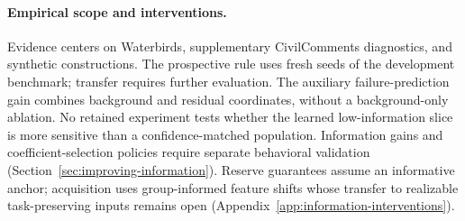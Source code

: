 \paragraph{Empirical scope and interventions.}
Evidence centers on Waterbirds, supplementary CivilComments diagnostics, and synthetic constructions. The prospective rule uses fresh seeds of the development benchmark; transfer requires further evaluation. The auxiliary failure-prediction gain combines background and residual coordinates, without a background-only ablation. No retained experiment tests whether the learned low-information slice is more sensitive than a confidence-matched population. Information gains and coefficient-selection policies require separate behavioral validation (Section~\ref{sec:improving-information}). Reserve guarantees assume an informative anchor; acquisition uses group-informed feature shifts whose transfer to realizable task-preserving inputs remains open (Appendix~\ref{app:information-interventions}).
